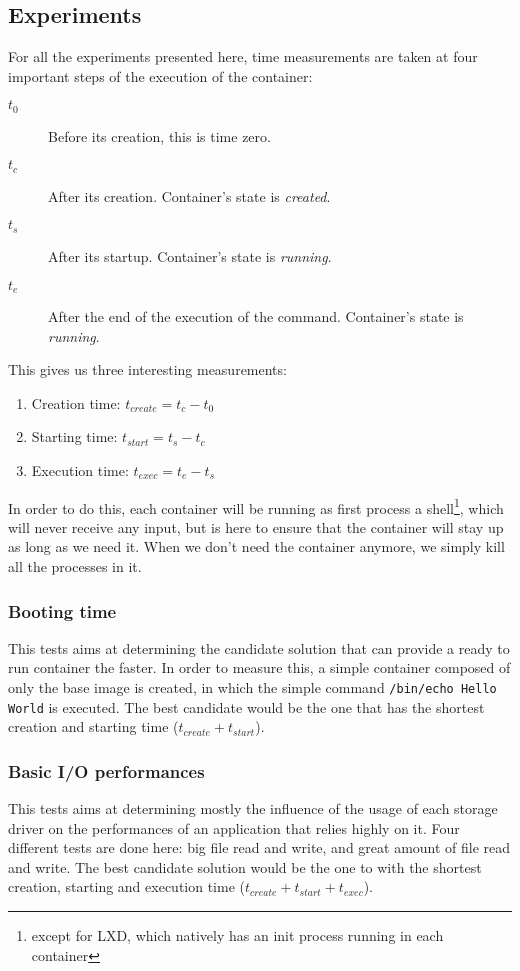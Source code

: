 \subsection{Experiments} \label{subs:experiments}
For all the experiments presented here, time measurements are taken at four important steps of the execution of the container:
\begin{description}
  \item[$t_0$] Before its creation, this is time zero.
  \item[$t_c$] After its creation. Container's state is \textit{created}.
  \item[$t_s$] After its startup. Container's state is \textit{running}.
  \item[$t_e$] After the end of the execution of the command. Container's state is \textit{running}.
\end{description}
This gives us three interesting measurements:
\begin{enumerate}
  \item Creation time: $t_{create}=t_c - t_0$
  \item Starting time: $t_{start}=t_s - t_c$
  \item Execution time: $t_{exec}=t_e - t_s$
\end{enumerate}

In order to do this, each container will be running as first process a shell\footnote{except for LXD, which natively has an init process running in each container}, which will never receive any input, but is here to ensure that the container will stay up as long as we need it.  When we don't need the container anymore, we simply kill all the processes in it.

\subsubsection{Booting time}
This tests aims at determining the candidate solution that can provide a ready to run container the faster.  In order to measure this, a simple container composed of only the base image is created, in which the simple command \texttt{/bin/echo Hello World} is executed.  The best candidate would be the one that has the shortest creation and starting time ($t_{create} + t_{start}$).

\subsubsection{Basic I/O performances}
This tests aims at determining mostly the influence of the usage of each storage driver on the performances of an application that relies highly on it.  Four different tests are done here: big file read and write, and great amount of file read and write.  The best candidate solution would be the one to with the shortest creation, starting and execution time ($t_{create} + t_{start} + t_{exec}$).


